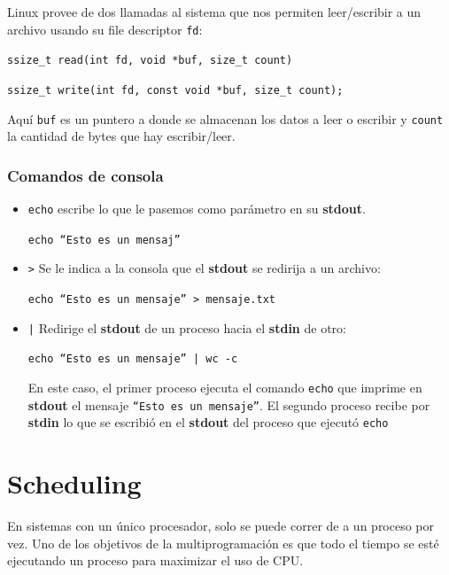 	Linux provee de dos llamadas al sistema que nos permiten leer/escribir a un archivo usando su file descriptor \texttt{fd}:
	
	\begin{center}
		\texttt{ssize\_t read(int fd, void *buf, size\_t count)}

		\texttt{ssize\_t write(int fd, const void *buf, size\_t count);}
	\end{center}
	
Aquí \texttt{buf} es un puntero a donde se almacenan los datos a leer o escribir y \texttt{count} la cantidad de bytes que hay escribir/leer.

\subsubsection{Comandos de consola}
\begin{itemize}
	\item \texttt{echo} escribe lo que le pasemos como parámetro en su \textbf{stdout}.
	\begin{center}
		\texttt{echo ``Esto es un mensaj''}	\end{center}
	\item \texttt{>} Se le indica a la consola que el \textbf{stdout} se redirija a un archivo:
	\begin{center}
		\texttt{echo ``Esto es un mensaje'' > mensaje.txt}
	\end{center}
	\item \texttt{|} Redirige el \textbf{stdout} de un proceso hacia el \textbf{stdin} de otro:
	
	\begin{center}
		\texttt{echo ``Esto es un mensaje'' | wc -c}
	\end{center}

	En este caso, el primer proceso ejecuta el comando \texttt{echo} que imprime en \textbf{stdout} el mensaje \texttt{``Esto es un mensaje''}. El segundo proceso recibe por \textbf{stdin} lo que se escribió en el \textbf{stdout} del proceso que ejecutó \texttt{echo}
\end{itemize}
\printbibliography[keyword=procesos,title=Bibliografía]

\newpage
	
\section{Scheduling} 
	En sistemas con un único procesador, solo se puede correr de a un proceso por vez. Uno de los objetivos de la multiprogramación es que todo el tiempo se esté ejecutando un proceso para maximizar el uso de CPU.
	
